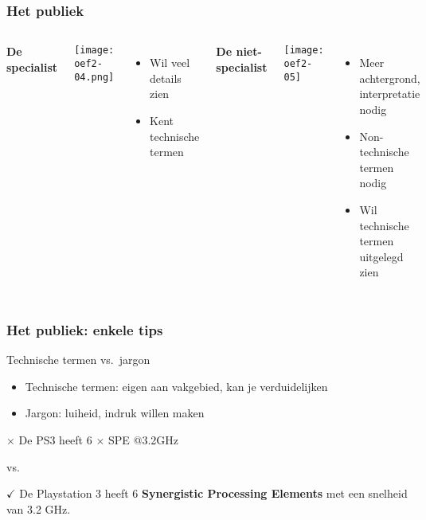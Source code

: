 \documentclass[aspectratio=169]{beamer}
\begin{document}
\begin{frame}
  \frametitle{Het publiek}
  
  \begin{columns}[c]
    
    \centering
    
    \textbf{De specialist}
    
    \texttt{[image: oef2-04.png]}
    
    \begin{itemize}
      \item Wil veel details zien
      \item Kent technische termen
    \end{itemize}
    
    
    \centering
    
    \textbf{De niet-specialist}
    
    \texttt{[image: oef2-05]}
    
    \begin{itemize}
      \item Meer achtergrond, interpretatie nodig
      \item Non-technische termen nodig
      \item Wil technische termen uitgelegd zien
    \end{itemize}
  \end{columns}
\end{frame}

\begin{frame}
  \frametitle{Het publiek: enkele tips}
  
  Technische termen vs.\ jargon
  
  \begin{itemize}
    \item Technische termen: eigen aan vakgebied, kan je verduidelijken
    \item Jargon: luiheid, indruk willen maken
  \end{itemize}
  
  \vfill
  
  \centering
  
  \textcolor{hgorange}{\(\times\) De PS3 heeft 6 \(\times\) SPE @3.2GHz}
  
  vs.
  
  \textcolor{hgdarkgreen}{\(\checkmark\) De Playstation 3 heeft 6 \textbf{Synergistic Processing Elements} met een snelheid van 3.2 GHz.}
\end{frame}
\end{document}
